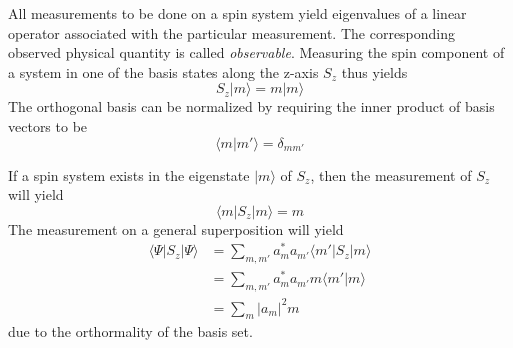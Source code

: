 \documentclass[11.5pt,a4paper]{article}
\begin{document}
All measurements to be done on a spin system yield eigenvalues of a linear operator associated with the particular measurement. The corresponding observed physical quantity is called \emph{observable}. Measuring the spin component of a system in one of the basis states along the z-axis $S_z$ thus yields
\begin{equation}
  S_z |m\rangle = m |m\rangle
\end{equation}
The orthogonal basis can be normalized by requiring the inner product of basis vectors to be
\begin{equation}
 \langle m|m'\rangle = \delta_{m m'}
  \label{eq-orthonormality}
\end{equation}

If a spin system exists in the eigenstate $|m\rangle$ of $S_z$, then the measurement of $S_z$ will yield
\begin{equation}
 \langle m | S_z | m \rangle = m
\end{equation}
The measurement on a general superposition will yield
\begin{align}
 \langle \Psi | S_z | \Psi \rangle & = \sum_{m,m'} a_m^* a_{m'} \langle m' | S_z | m \rangle\\
  & = \sum_{m,m'} a_m^* a_{m'} m \langle m' | m \rangle\\
  & = \sum_{m} |a_{m}|^2  m
\end{align}
due to the orthormality of the basis set.
\end{document}
